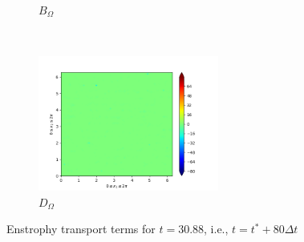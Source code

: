 \begin{figure}[H]
\begin{subfigure}{0.45\textwidth}
        \caption{$B_{\Omega}$}
    \end{subfigure}
    ~
    \begin{subfigure}{0.45\textwidth}
        \includegraphics[height=1.75in]{media/run-cds-65/D-enst-1420.png}
        \caption{$D_{\Omega}$}
    \end{subfigure}
    \caption{Enstrophy transport terms for $t=30.88$, i.e., $t=t^{\ast} + 80 \Delta t$}
\end{figure}

\newpage

